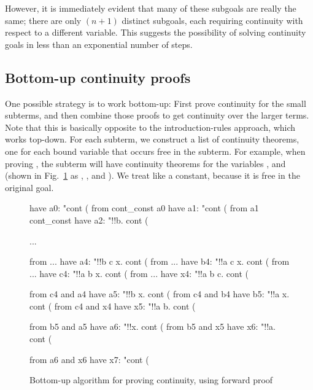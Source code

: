 However, it is immediately evident that many of these subgoals are really the same; there are only $(n+1)$ distinct subgoals, each requiring continuity with respect to a different variable. This suggests the possibility of solving continuity goals in less than an exponential number of steps.

\subsection{Bottom-up continuity proofs}

One possible strategy is to work bottom-up: First prove continuity for the small subterms, and then combine those proofs to get continuity over the larger terms. Note that this is basically opposite to the introduction-rules approach, which works top-down. For each subterm, we construct a list of continuity theorems, one for each bound variable that occurs free in the subterm. For example, when proving , the subterm  will have continuity theorems for the variables ,  and  (shown in Fig.~\ref{fig:holcf-cont-algorithm} as , , and ). We treat  like a constant, because it is free in the original goal.

\begin{figure}
\begin{singlespace}
\begin{isabelle}
have a0: "cont (%
from cont_const a0 have a1: "cont (%
from a1 cont_const have a2: "!!b. cont (%

...

from ... have a4: "!!b c x. cont (%
from ... have b4: "!!a c x. cont (%
from ... have c4: "!!a b x. cont (%
from ... have x4: "!!a b c. cont (%

from c4 and a4 have a5: "!!b x. cont (%
from c4 and b4 have b5: "!!a x. cont (%
from c4 and x4 have x5: "!!a b. cont (%
 
from b5 and a5 have a6: "!!x. cont (%
from b5 and x5 have x6: "!!a. cont (%

from a6 and x6 have x7: "cont (%
\end{isabelle}
\end{singlespace}
\caption{Bottom-up algorithm for proving continuity, using forward proof}
\label{fig:holcf-cont-algorithm}
\end{figure}

